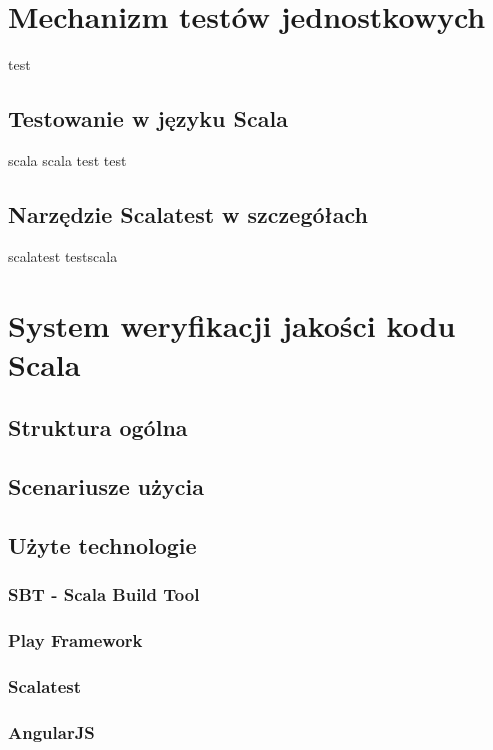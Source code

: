 \documentclass[brudnopis]{xmgr}
\begin{document}
\chapter{Mechanizm testów jednostkowych}

test
    
\section{Testowanie w języku Scala}

scala scala test test 
      
\section{Narzędzie Scalatest w szczegółach}

scalatest testscala

\chapter{System weryfikacji jakości kodu Scala}

\section{Struktura ogólna}

\section{Scenariusze użycia}

\section{Użyte technologie}

\subsection{SBT - Scala Build Tool}

\subsection{Play Framework}

\subsection{Scalatest}

\subsection{AngularJS}
\end{document}
